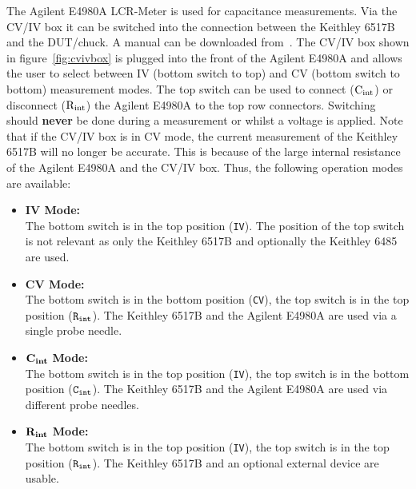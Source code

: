 \documentclass[a4paper]{article}
\begin{document}
The Agilent E4980A LCR-Meter is used for capacitance measurements.
Via the CV/IV box it can be switched into the connection between the Keithley 6517B and the DUT/chuck.
A manual can be downloaded from~\cite{ref:agilentref}.
The CV/IV box shown in figure~\ref{fig:cvivbox} is plugged into the front of the Agilent E4980A and allows the user to select between IV (bottom switch to top) and CV (bottom switch to bottom) measurement modes.
The top switch can be used to connect (${\rm C_{int}}$) or disconnect (${\rm R_{int}}$) the Agilent E4980A to the top row connectors.
Switching should {\bf never} be done during a measurement or whilst a voltage is applied.
Note that if the CV/IV box is in CV mode, the current measurement of the Keithley 6517B will no longer be accurate.
This is because of the large internal resistance of the Agilent E4980A and the CV/IV box.
Thus, the following operation modes are available:\\

\begin{itemize}
\item{{\bf IV Mode:\\}}
The bottom switch is in the top position ({\tt IV}).
The position of the top switch is not relevant as only the Keithley 6517B and optionally the Keithley 6485 are used.

\item{{\bf CV Mode:\\}}
The bottom switch is in the bottom position ({\tt CV}), the top switch is in the top position (${\tt R_{int}}$).
The Keithley 6517B and the Agilent E4980A are used via a single probe needle.

\item{${\rm {\bf C_{int}}}$ {\bf Mode:\\}}
The bottom switch is in the top position ({\tt IV}), the top switch is in the bottom position (${\tt C_{int}}$).
The Keithley 6517B and the Agilent E4980A are used via different probe needles.

\item{${\rm {\bf R_{int}}}$ {\bf Mode:\\}}
The bottom switch is in the top position ({\tt IV}), the top switch is in the top position (${\tt R_{int}}$).
The Keithley 6517B and an optional external device are usable.
\end{itemize}
\end{document}
